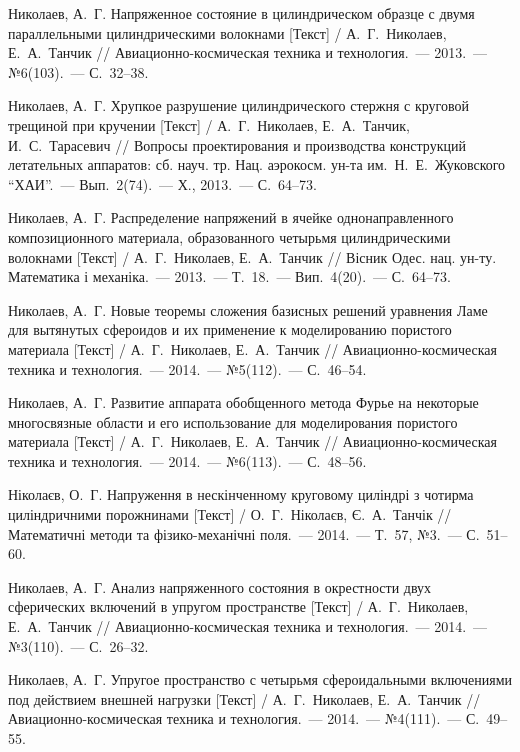 \documentclass[book,14pt,small,oneside]{ncc}
\begin{document}
\begin{biblist}{99}
Николаев, А.~Г. 
Напряженное состояние в цилиндрическом образце с двумя параллельными цилиндрическими волокнами [Текст] 
/ А.~Г.~Николаев, Е.~А.~Танчик 
// Авиационно-космическая техника и технология.~--- 2013.~--- №6(103).~--- С.~32--38.

Николаев, А.~Г. 
Хрупкое разрушение цилиндрического стержня с круговой трещиной при кручении [Текст] 
/ А.~Г.~Николаев, Е.~А.~Танчик, И.~С.~Тарасевич 
// Вопросы проектирования и производства конструкций летательных аппаратов: сб. науч. тр. Нац. аэрокосм. ун-та им.~Н.~Е.~Жуковского ``ХАИ''.~--- Вып.~2(74).~--- Х., 2013.~--- С.~64--73.

Николаев, А.~Г. 
Распределение напряжений в ячейке однонаправленного композиционного материала, образованного четырьмя цилиндрическими волокнами [Текст] / А.~Г.~Николаев, Е.~А.~Танчик 
// Вісник Одес. нац. ун-ту. Математика і механіка.~--- 2013.~--- Т.~18.~--- Вип.~4(20).~--- С.~64--73.

Николаев, А.~Г. 
Новые теоремы сложения базисных решений уравнения Ламе для вытянутых сфероидов и их применение к моделированию пористого материала [Текст] 
/ А.~Г.~Николаев, Е.~А.~Танчик 
// Авиационно-космическая техника и технология.~--- 2014.~--- №5(112).~--- С.~46--54.

Николаев, А.~Г. 
Развитие аппарата обобщенного метода Фурье на некоторые многосвязные области и его использование для моделирования пористого материала [Текст] 
/ А.~Г.~Николаев, Е.~А.~Танчик 
// Авиационно-космическая техника и технология.~--- 2014.~--- №6(113).~--- С.~48--56.

Ніколаєв, О.~Г. 
Напруження в нескінченному круговому циліндрі з чотирма циліндричними порожнинами [Текст] 
/ О.~Г.~Ніколаєв, Є.~А.~Танчік 
// Математичні методи та фізико-механічні поля.~--- 2014.~--- Т.~57, №3.~--- С.~51--60.

Николаев, А.~Г. 
Анализ напряженного состояния в окрестности двух сферических включений в упругом пространстве [Текст] 
/ А.~Г.~Николаев, Е.~А.~Танчик 
// Авиационно-космическая техника и технология.~--- 2014.~--- №3(110).~--- С.~26--32.

Николаев, А.~Г. 
Упругое пространство с четырьмя сфероидальными включениями под действием внешней нагрузки [Текст] 
/ А.~Г.~Николаев, Е.~А.~Танчик 
// Авиационно-космическая техника и технология.~--- 2014.~--- №4(111).~--- С.~49--55.


\end{biblist}
\end{document}
